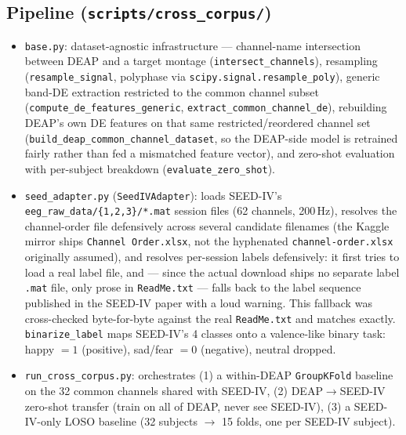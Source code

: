 \documentclass[11pt]{report}
\begin{document}
\subsection{Pipeline (\texttt{scripts/cross\_corpus/})}
\label{sec:seed-iv-adapter}
\begin{itemize}
  \item \texttt{base.py}: dataset-agnostic infrastructure --- channel-name
        intersection between DEAP and a target montage
        (\texttt{intersect\_channels}), resampling
        (\texttt{resample\_signal}, polyphase via
        \texttt{scipy.signal.resample\_poly}), generic band-DE extraction
        restricted to the common channel subset
        (\texttt{compute\_de\_features\_generic},
        \texttt{extract\_common\_channel\_de}), rebuilding DEAP's own DE
        features on that same restricted/reordered channel set
        (\texttt{build\_deap\_common\_channel\_dataset}, so the DEAP-side
        model is retrained fairly rather than fed a mismatched feature
        vector), and zero-shot evaluation with per-subject breakdown
        (\texttt{evaluate\_zero\_shot}).
  \item \texttt{seed\_adapter.py} (\texttt{SeedIVAdapter}): loads SEED-IV's
        \texttt{eeg\_raw\_data/\{1,2,3\}/*.mat} session files (62 channels,
        200\,Hz), resolves the channel-order file defensively across several
        candidate filenames (the Kaggle mirror ships \texttt{Channel
        Order.xlsx}, not the hyphenated \texttt{channel-order.xlsx}
        originally assumed), and resolves per-session labels defensively:
        it first tries to load a real label file, and --- since the actual
        download ships no separate label \texttt{.mat} file, only prose in
        \texttt{ReadMe.txt} --- falls back to the label sequence published
        in the SEED-IV paper with a loud warning. This fallback was
        cross-checked byte-for-byte against the real \texttt{ReadMe.txt} and
        matches exactly. \texttt{binarize\_label} maps SEED-IV's 4 classes
        onto a valence-like binary task: happy $=1$ (positive), sad/fear
        $=0$ (negative), neutral dropped.
  \item \texttt{run\_cross\_corpus.py}: orchestrates (1) a within-DEAP
        \texttt{GroupKFold} baseline on the 32 common channels shared with
        SEED-IV, (2) DEAP$\to$SEED-IV zero-shot transfer (train on all of
        DEAP, never see SEED-IV), (3) a SEED-IV-only LOSO baseline (32
        subjects $\to$ 15 folds, one per SEED-IV subject).
\end{itemize}
\end{document}
